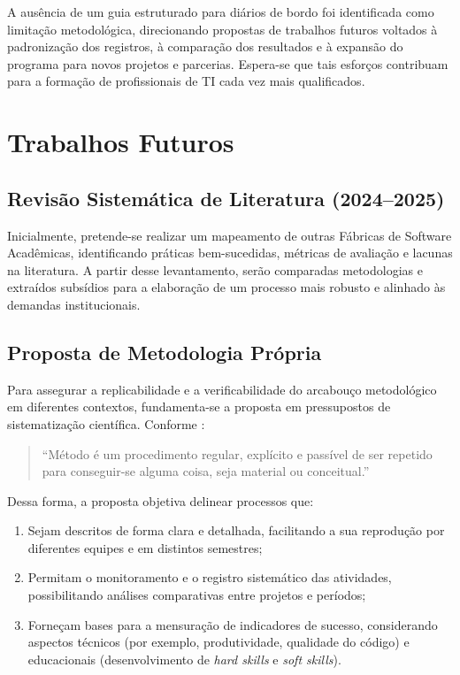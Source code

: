 \documentclass[
	12pt,           %
	openright,      %
	oneside,        %
	a4paper,        %
	brazil          %
]{abntex2}
\begin{document}
A ausência de um guia estruturado para diários de bordo foi identificada como limitação metodológica, direcionando propostas de trabalhos futuros voltados à padronização dos registros, à comparação dos resultados e à expansão do programa para novos projetos e parcerias. Espera-se que tais esforços contribuam para a formação de profissionais de TI cada vez mais qualificados.

\section{Trabalhos Futuros}
\label{sec:trabalhos-futuros}

\subsection{Revis\~ao Sistem\'atica de Literatura (2024--2025)}
Inicialmente, pretende-se realizar um mapeamento de outras Fábricas de Software Acadêmicas, identificando práticas bem-sucedidas, métricas de avaliação e lacunas na literatura. A partir desse levantamento, serão comparadas metodologias e extraídos subsídios para a elaboração de um processo mais robusto e alinhado às demandas institucionais.

\subsection{Proposta de Metodologia Pr\'opria}
Para assegurar a replicabilidade e a verificabilidade do arcabouço metodológico em diferentes contextos, fundamenta-se a proposta em pressupostos de sistematização científica. Conforme :
\begin{quote}
    ``M\'etodo \'e um procedimento regular, expl\'icito e pass\'ivel de ser repetido para conseguir-se alguma coisa, seja material ou conceitual.''
\end{quote}

Dessa forma, a proposta objetiva delinear processos que:
\begin{enumerate}
    \item Sejam descritos de forma clara e detalhada, facilitando a sua reprodução por diferentes equipes e em distintos semestres;
    \item Permitam o monitoramento e o registro sistemático das atividades, possibilitando análises comparativas entre projetos e períodos;
    \item Forneçam bases para a mensuração de indicadores de sucesso, considerando aspectos técnicos (por exemplo, produtividade, qualidade do código) e educacionais (desenvolvimento de \emph{hard skills} e \emph{soft skills}).
\end{enumerate}
\end{document}
